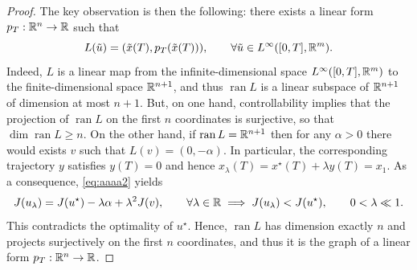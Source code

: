 \begin{proof}
    The key observation is then the following: there exists a linear form $p_T:\mathbb{R}^n\to \mathbb{R}$ such that 
    \begin{equation}
        \label{eq:L-der}
        L(\tilde u) = (\tilde x(T),p_T(\tilde x(T))), \qquad \forall \tilde u\in L^\infty([0,T],\mathbb{R}^m).
    \end{equation}
    Indeed, $L$ is a linear map from the infinite-dimensional space $L^\infty([0,T],\mathbb{R}^m)$ to the finite-dimensional space $\mathbb{R}^{n+1}$, and thus $\operatorname{ran} L$ is a linear subspace of $\mathbb{R}^{n+1}$ of dimension at most $n+1$. But, on one hand, controllability implies that the projection of $\operatorname{ran} L$ on the first $n$ coordinates is surjective, so that $\dim \operatorname{ran} L\ge n$. On the other hand, if $\operatorname{ran} L = \mathbb{R}^{n+1}$ then for any $\alpha>0$ there would exists $v$ such that $L(v) = (0,-\alpha)$. 
    In particular, the corresponding trajectory $y$ satisfies $y(T)=0$ and hence $x_\lambda (T) = x^\star(T) +\lambda y(T) = x_1$. 
    As a consequence, \eqref{eq:aaaa2} yields 
    \begin{equation}
    J(u_\lambda) = J(u^\star)-\lambda \alpha+ \lambda^2 J(v), \qquad \forall \lambda\in\mathbb{R} 
    \implies J(u_\lambda) < J(u^\star), \qquad 0<\lambda \ll 1.
    \end{equation} 
    This contradicts the optimality of $u^\star$. Hence, $\operatorname{ran} L$ has dimension exactly $n$ and projects surjectively on the first $n$ coordinates, and thus it is the graph of a linear form $p_T:\mathbb{R}^n\to \mathbb{R}$.


\end{proof}
